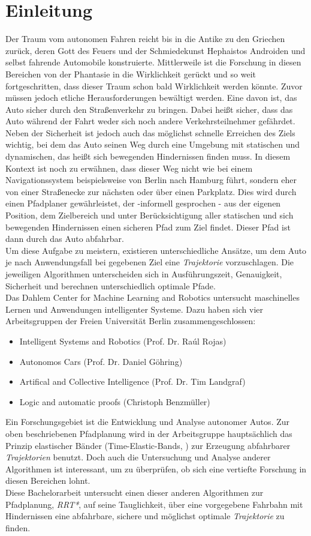 \section{Einleitung}
Der Traum vom autonomen Fahren reicht bis in die Antike zu den Griechen zurück, deren Gott des Feuers und der Schmiedekunst Hephaistos Androiden und selbst fahrende Automobile konstruierte. Mittlerweile ist die Forschung in diesen Bereichen von der Phantasie in die Wirklichkeit gerückt und so weit fortgeschritten, dass dieser Traum schon bald Wirklichkeit werden könnte. Zuvor müssen jedoch etliche Herausforderungen bewältigt werden. Eine davon ist, das Auto sicher durch den Straßenverkehr zu bringen. Dabei heißt sicher, dass das Auto während der Fahrt weder sich noch andere Verkehrsteilnehmer gefährdet. Neben der Sicherheit ist jedoch auch das möglichst schnelle Erreichen des Ziels wichtig, bei dem das Auto seinen Weg durch eine Umgebung mit statischen und dynamischen, das heißt sich bewegenden Hindernissen finden muss. In diesem Kontext ist noch zu erwähnen, dass dieser Weg nicht wie bei einem Navigationssystem beispielsweise von Berlin nach Hamburg führt, sondern eher von einer Straßenecke zur nächsten oder über einen Parkplatz. Dies wird durch einen Pfadplaner gewährleistet, der -informell gesprochen - aus der eigenen Position, dem Zielbereich und unter Berücksichtigung aller statischen und sich bewegenden Hindernissen einen sicheren Pfad zum Ziel findet. Dieser Pfad ist dann durch das Auto abfahrbar.\\
Um diese Aufgabe zu meistern, existieren unterschiedliche Ansätze, um dem Auto je nach Anwendungsfall bei gegebenen Ziel eine \textit{Trajektorie} vorzuschlagen. Die jeweiligen Algorithmen unterscheiden sich in Ausführungszeit, Genauigkeit, Sicherheit und berechnen unterschiedlich optimale Pfade.  \\
Das Dahlem Center for Machine Learning and Robotics untersucht maschinelles Lernen und Anwendungen intelligenter Systeme. Dazu haben sich vier Arbeitsgruppen der Freien Universität Berlin zusammengeschlossen:
\begin{itemize}
\item Intelligent Systems and Robotics (Prof. Dr. Raúl Rojas)
\item Autonomos Cars (Prof. Dr. Daniel Göhring)
\item Artifical and Collective Intelligence (Prof. Dr. Tim Landgraf)
\item Logic and automatic proofs (Christoph Benzmüller)
\end{itemize}
Ein Forschungsgebiet ist die Entwicklung und Analyse autonomer Autos. Zur oben beschriebenen Pfadplanung wird in der Arbeitsgruppe hauptsächlich das Prinzip elastischer Bänder (Time-Elastic-Bands, \citep[vgl.][]{RoeHoBe}) zur Erzeugung abfahrbarer \textit{Trajektorien} benutzt. Doch auch die Untersuchung und Analyse anderer Algorithmen ist interessant, um zu überprüfen, ob sich eine vertiefte Forschung in diesen Bereichen lohnt. \\ 
Diese Bachelorarbeit untersucht einen dieser anderen Algorithmen zur Pfadplanung, \textit{RRT*}, auf seine Tauglichkeit, über eine vorgegebene Fahrbahn mit Hindernissen eine abfahrbare, sichere und möglichst optimale \textit{Trajektorie} zu finden. 

